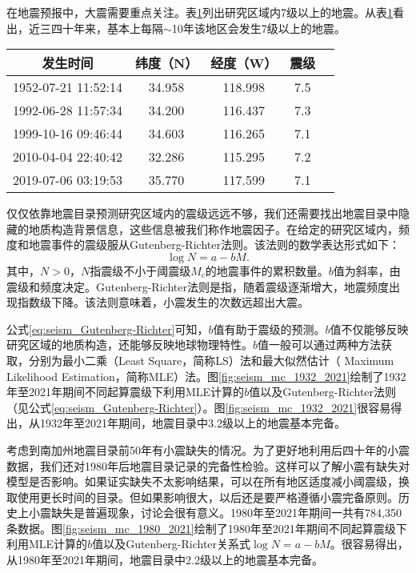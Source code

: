 在地震预报中，大震需要重点关注。表\ref{tab:seism_magnitude_7}列出研究区域内7级以上的地震。从表\ref{tab:seism_magnitude_7}看出，近三四十年来，基本上每隔$\sim$10年该地区会发生7级以上的地震。

\begin{table}[!htbp]
  \label{tab:seism_magnitude_7}
  \centering
  \footnotesize
  \begin{tabular}{ccccc} 
    \toprule
    发生时间 & 纬度（N） & 经度（W） & 震级 \\
    \midrule
    1952-07-21 11:52:14 & 34.958 & 118.998 & 7.5 \\
    1992-06-28 11:57:34 & 34.200 & 116.437 & 7.3 \\
    1999-10-16 09:46:44 & 34.603 & 116.265 & 7.1 \\
    2010-04-04 22:40:42 & 32.286 & 115.295 & 7.2 \\
    2019-07-06 03:19:53 & 35.770 & 117.599 & 7.1 \\
    \bottomrule
  \end{tabular}
\end{table}

仅仅依靠地震目录预测研究区域内的震级远远不够，我们还需要找出地震目录中隐藏的地质构造背景信息，这些信息被我们称作地震因子。在给定的研究区域内，频度和地震事件的震级服从Gutenberg-Richter法则\citep{Gutenberg1994Frequency,Panakkat2007Neural}。该法则的数学表达形式如下：
\begin{equation}
  \label{eq:seism_Gutenberg-Richter}
  \log N=a-bM.
\end{equation}
其中，$N>0$，$N$指震级不小于阈震级$M_c$的地震事件的累积数量。$b$值为斜率，由震级和频度决定。Gutenberg-Richter法则是指，随着震级逐渐增大，地震频度出现指数级下降\citep{Asim2018Earthquake}。该法则意味着，小震发生的次数远超出大震。

公式\ref{eq:seism_Gutenberg-Richter}可知，$b$值有助于震级的预测。$b$值不仅能够反映研究区域的地质构造，还能够反映地球物理特性。$b$值一般可以通过两种方法获取，分别为最小二乘（Least Square，简称LS）法和最大似然估计（ Maximum Likelihood Estimation，简称MLE）法。图\ref{fig:seism_mc_1932_2021}绘制了1932年至2021年期间不同起算震级下利用MLE计算的$b$值以及Gutenberg-Richter法则（见公式\ref{eq:seism_Gutenberg-Richter}）。图\ref{fig:seism_mc_1932_2021}很容易得出，从1932年至2021年期间，地震目录中3.2级以上的地震基本完备。

考虑到南加州地震目录前50年有小震缺失的情况。为了更好地利用后四十年的小震数据，我们还对1980年后地震目录记录的完备性检验。这样可以了解小震有缺失对模型是否影响。如果证实缺失不太影响结果，可以在所有地区适度减小阈震级，换取使用更长时间的目录。但如果影响很大，以后还是要严格遵循小震完备原则。历史上小震缺失是普遍现象，讨论会很有意义。1980年至2021年期间一共有784,350条数据。图\ref{fig:seism_mc_1980_2021}绘制了1980年至2021年期间不同起算震级下利用MLE计算的$b$值以及Gutenberg-Richter关系式$\log N=a-bM$。很容易得出，从1980年至2021年期间，地震目录中2.2级以上的地震基本完备。

